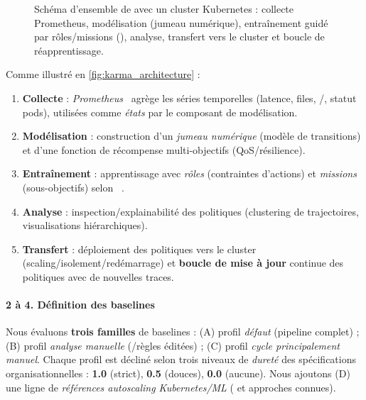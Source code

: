 \begin{figure}[h!]
  \centering
  
  \caption{Schéma d’ensemble de  avec un cluster Kubernetes : collecte Prometheus, modélisation (jumeau numérique), entraînement guidé par rôles/missions (), analyse, transfert vers le cluster et boucle de réapprentissage.}
  \label{fig:karma_architecture}
\end{figure}

Comme illustré en \autoref{fig:karma_architecture} :
\begin{enumerate}[label=\textbf{\arabic*)}, leftmargin=3.5mm, itemsep=2pt, topsep=2pt]
  \item \textbf{Collecte} : \textit{Prometheus}~\cite{prometheus} agrège les séries temporelles (latence, files, /, statut pods), utilisées comme \emph{états} par le composant de modélisation.
  \item \textbf{Modélisation} : construction d’un \emph{jumeau numérique} (modèle de transitions) et d’une fonction de récompense multi-objectifs (QoS/résilience).
  \item \textbf{Entraînement} : apprentissage  avec \textit{rôles} (contraintes d’actions) et \textit{missions} (sous-objectifs) selon ~\cite{soule2024aomea}.
  \item \textbf{Analyse} : inspection/explainabilité des politiques (clustering de trajectoires, visualisations hiérarchiques).
  \item \textbf{Transfert} : déploiement des politiques vers le cluster (scaling/isolement/redémarrage) et \textbf{boucle de mise à jour} continue des politiques avec de nouvelles traces.
\end{enumerate}

\paragraph{2 à 4. Définition des baselines}

Nous évaluons \textbf{trois familles} de baselines : (A) profil \emph{défaut} (pipeline  complet) ; (B) profil \emph{analyse manuelle} (/règles éditées) ; (C) profil \emph{cycle principalement manuel}. Chaque profil est décliné selon trois niveaux de \emph{dureté} des spécifications organisationnelles : \textbf{1.0} (strict), \textbf{0.5} (douces), \textbf{0.0} (aucune). Nous ajoutons (D) une ligne de \emph{références autoscaling Kubernetes/ML} ( et approches  connues).

